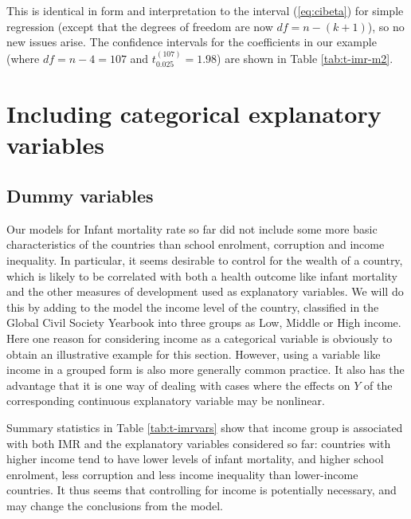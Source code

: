 \documentclass[11pt,a4paper,openany]{book}
\begin{document}
This is identical in form and interpretation to the interval
(\ref{eq:cibeta}) for simple regression (except that the degrees of
freedom are now \(df=n-(k+1)\)), so no new issues arise. The confidence
intervals for the coefficients in our example (where \(df=n-4=107\) and
\(t_{0.025}^{(107)}=1.98\)) are shown in Table \ref{tab:t-imr-m2}.

\section{Including categorical explanatory
variables}\label{s-regression-dummies}

\subsection{Dummy variables}\label{ss-regression-dummies-def}

Our models for Infant mortality rate so far did not include some more
basic characteristics of the countries than school enrolment, corruption
and income inequality. In particular, it seems desirable to control for
the wealth of a country, which is likely to be correlated with both a
health outcome like infant mortality and the other measures of
development used as explanatory variables. We will do this by adding to
the model the income level of the country, classified in the Global
Civil Society Yearbook into three groups as Low, Middle or High income.
Here one reason for considering income as a categorical variable is
obviously to obtain an illustrative example for this section. However,
using a variable like income in a grouped form is also more generally
common practice. It also has the advantage that it is one way of dealing
with cases where the effects on \(Y\) of the corresponding continuous
explanatory variable may be nonlinear.

Summary statistics in Table \ref{tab:t-imrvars} show that income group
is associated with both IMR and the explanatory variables considered so
far: countries with higher income tend to have lower levels of infant
mortality, and higher school enrolment, less corruption and less income
inequality than lower-income countries. It thus seems that controlling
for income is potentially necessary, and may change the conclusions from
the model.
\end{document}
